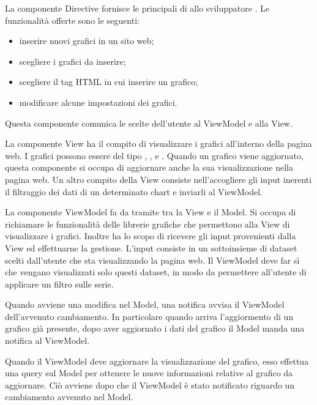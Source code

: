 			La componente Directive fornisce le principali  di  allo sviluppatore . Le funzionalità offerte sono le seguenti:
			\begin{itemize}
				\item inserire nuovi grafici in un sito web;
				\item scegliere i grafici da inserire;
				\item scegliere il tag HTML in cui inserire un grafico;
				\item modificare alcune impostazioni dei grafici.
			\end{itemize}
			Questa componente comunica le scelte dell'utente al ViewModel e alla View.
    		
			La componente View ha il compito di visualizzare i grafici all'interno della pagina web. I grafici possono essere del tipo , ,  e . Quando un grafico viene aggiornato, questa componente si occupa di aggiornare anche la sua visualizzazione nella pagina web. Un altro compito della View consiste nell'accogliere gli input inerenti il filtraggio dei dati di un determinato chart e inviarli al ViewModel.
			
			La componente ViewModel fa da tramite tra la View e il Model. Si occupa di richiamare le funzionalità delle librerie grafiche che permettono alla View di visualizzare i grafici. Inoltre ha lo scopo di ricevere gli input provenienti dalla View ed effettuarne la gestione. L'input consiste in un sottoinsieme di dataset scelti dall'utente che sta visualizzando la pagina web. Il ViewModel deve far sì che vengano visualizzati solo questi dataset, in modo da permettere all'utente di applicare un filtro sulle serie.
			    
			Quando avviene una modifica nel Model, una notifica avvisa il ViewModel dell'avvenuto cambiamento. In particolare quando arriva l'aggiormento di un grafico già presente, dopo aver aggiornato i dati del grafico il Model manda una notifica al ViewModel.

			Quando il ViewModel deve aggiornare la visualizzazione del grafico, esso effettua una query sul Model per ottenere le nuove informazioni relative al grafico da aggiornare. Ciò avviene dopo che il ViewModel è stato notificato riguardo un cambiamento avvenuto nel Model. 
			
